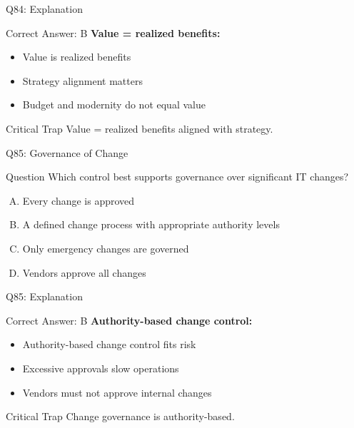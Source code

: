 \documentclass{beamer}
\begin{document}
	\begin{frame}{Q84: Explanation}
		\begin{block}{Correct Answer: B}
			\textbf{Value = realized benefits:}
			\begin{itemize}
				\item Value is realized benefits
				\item Strategy alignment matters
				\item Budget and modernity do not equal value
			\end{itemize}
		\end{block}
		\begin{alertblock}{Critical Trap}
			Value = realized benefits aligned with strategy.
		\end{alertblock}
	\end{frame}
	
	\begin{frame}{Q85: Governance of Change}
		\begin{block}{Question}
			Which control best supports governance over significant IT changes?
		\end{block}
		\begin{enumerate}[(A)]
			\item Every change is approved
			\item A defined change process with appropriate authority levels
			\item Only emergency changes are governed
			\item Vendors approve all changes
		\end{enumerate}
	\end{frame}
	
	\begin{frame}{Q85: Explanation}
		\begin{block}{Correct Answer: B}
			\textbf{Authority-based change control:}
			\begin{itemize}
				\item Authority-based change control fits risk
				\item Excessive approvals slow operations
				\item Vendors must not approve internal changes
			\end{itemize}
		\end{block}
		\begin{alertblock}{Critical Trap}
			Change governance is authority-based.
		\end{alertblock}
	\end{frame}
	
\end{document}
